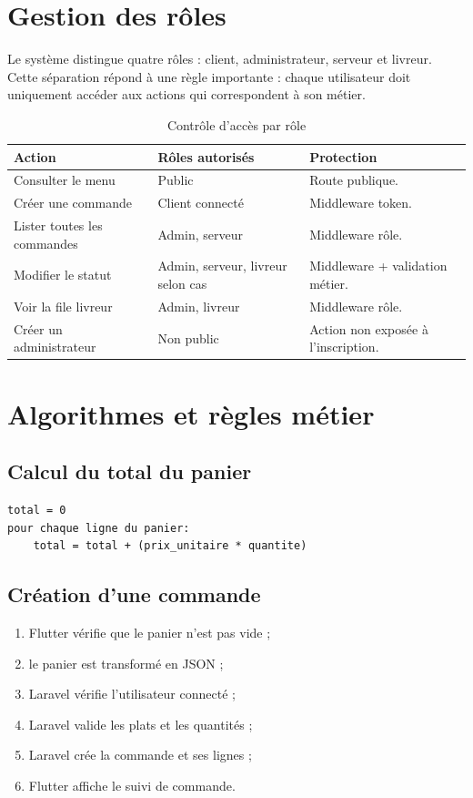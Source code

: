 \documentclass[12pt,a4paper]{report}
\begin{document}
\section{Gestion des rôles}
Le système distingue quatre rôles : client, administrateur, serveur et livreur. Cette séparation répond à une règle importante : chaque utilisateur doit uniquement accéder aux actions qui correspondent à son métier.

\begin{longtable}{p{4cm}p{5cm}p{5cm}}
\caption{Contrôle d'accès par rôle}\\
\toprule
\textbf{Action} & \textbf{Rôles autorisés} & \textbf{Protection}\\
\midrule
Consulter le menu & Public & Route publique.\\
Créer une commande & Client connecté & Middleware token.\\
Lister toutes les commandes & Admin, serveur & Middleware rôle.\\
Modifier le statut & Admin, serveur, livreur selon cas & Middleware + validation métier.\\
Voir la file livreur & Admin, livreur & Middleware rôle.\\
Créer un administrateur & Non public & Action non exposée à l'inscription.\\
\bottomrule
\end{longtable}

\section{Algorithmes et règles métier}
\subsection{Calcul du total du panier}
\begin{lstlisting}[style=monpf,caption={Principe du calcul de total}]
total = 0
pour chaque ligne du panier:
    total = total + (prix_unitaire * quantite)
\end{lstlisting}

\subsection{Création d'une commande}
\begin{enumerate}
  \item Flutter vérifie que le panier n'est pas vide ;
  \item le panier est transformé en JSON ;
  \item Laravel vérifie l'utilisateur connecté ;
  \item Laravel valide les plats et les quantités ;
  \item Laravel crée la commande et ses lignes ;
  \item Flutter affiche le suivi de commande.
\end{enumerate}
\end{document}
